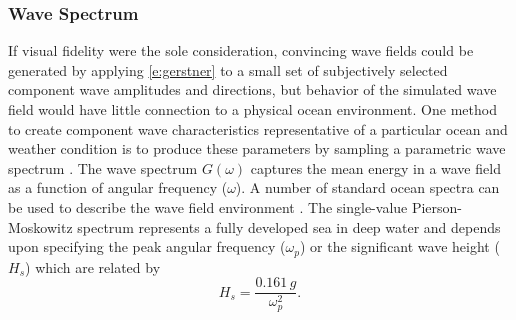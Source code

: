 \documentclass[utf8]{frontiersSCNS} %
\begin{document}
\subsubsection{Wave Spectrum}
If visual fidelity were the sole consideration, convincing wave fields could be generated by applying \eqref{e:gerstner} to a small set of subjectively selected component wave amplitudes and directions, but behavior of the simulated wave field would have little connection to a physical ocean environment.  One method to create component wave characteristics representative of a particular ocean and weather condition is to produce these parameters by sampling a parametric wave spectrum \citep{mastin87fourier,thon00ocean,frechot06realistic}.  The wave spectrum  $G(\omega)$ captures the mean energy in a wave field as a function of angular frequency ($\omega$).  A number of standard ocean spectra can be used to describe the wave field environment \citep{ittc02waves}.
The single-value Pierson-Moskowitz spectrum represents a fully developed sea in deep water and depends upon specifying  the peak angular frequency ($\omega_p$) or the significant wave height ($H_s$) which are related by
\begin{equation}
  H_s = \frac{0.161 \, g}{\omega_p^2}.
  \label{e:pmh}
\end{equation}
\end{document}
